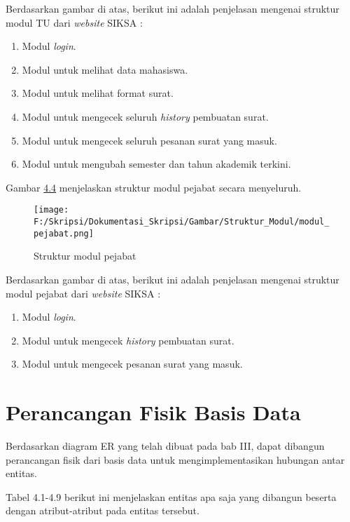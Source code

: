 Berdasarkan gambar di atas, berikut ini adalah penjelasan mengenai struktur modul TU dari \textit{website} SIKSA :
\begin{enumerate}
	\item Modul \textit{login}.
	\item Modul untuk melihat data mahasiswa.
	\item Modul untuk melihat format surat.
	\item Modul untuk mengecek seluruh \textit{history} pembuatan surat.
	\item Modul untuk mengecek seluruh pesanan surat yang masuk.
	\item Modul untuk mengubah semester dan tahun akademik terkini.
\end{enumerate}

Gambar \hyperlink{struktur_modul_pejabat}{4.4} menjelaskan struktur modul pejabat secara menyeluruh.

\begin{figure}[H]
	\centering
		\texttt{[image: F:/Skripsi/Dokumentasi\_Skripsi/Gambar/Struktur\_Modul/modul\_pejabat.png]}
	\caption{Struktur modul pejabat}
	\label{fig:struktur_modul_pejabat}
\end{figure}

Berdasarkan gambar di atas, berikut ini adalah penjelasan mengenai struktur modul pejabat dari \textit{website} SIKSA :
\begin{enumerate}
	\item Modul \textit{login}.
	\item Modul untuk mengecek \textit{history} pembuatan surat.
	\item Modul untuk mengecek pesanan surat yang masuk.
\end{enumerate}

\section{Perancangan Fisik Basis Data}
\label{sec:perancangan_fisik_basis_data}
Berdasarkan diagram ER yang telah dibuat pada bab III, dapat dibangun perancangan fisik dari basis data untuk mengimplementasikan hubungan antar entitas.\

Tabel 4.1-4.9 berikut ini menjelaskan entitas apa saja yang dibangun beserta dengan atribut-atribut pada entitas tersebut.

